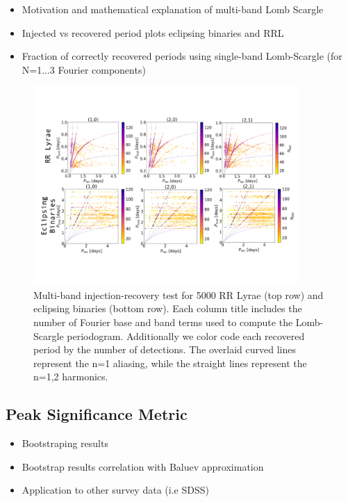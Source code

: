 \documentclass[DM,authoryear,toc]{lsstdoc}
\begin{document}
\begin{itemize}
\item Motivation and mathematical explanation of multi-band Lomb Scargle 
\item Injected vs recovered period plots eclipsing binaries and RRL
\item Fraction of correctly recovered periods using single-band Lomb-Scargle (for N=1...3 Fourier components)  
\end{itemize}


\begin{figure}
  \includegraphics[width=0.9\textwidth]{figures/multi_lsp_rectest.pdf}
  \centering 
  \caption{Multi-band injection-recovery test for 5000 RR Lyrae (top row) and eclipsing binaries (bottom row). Each column title includes the number of Fourier base and band terms used to compute the Lomb-Scargle periodogram. Additionally we color code each recovered period by the number of detections. The overlaid curved lines represent the n=1 aliasing, while the straight lines represent the n=1,2 harmonics.}
  \label{fig:comp}
\end{figure}


\subsection{Peak Significance Metric}

\begin{itemize}
\item Bootstraping results 
\item Bootstrap results correlation with Baluev approximation
\item Application to other survey data (i.e SDSS)
\end{itemize}
\end{document}
